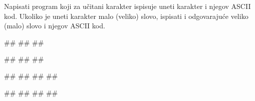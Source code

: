 \begin{Exercise}[label=v1.2_08] 
Napisati program koji za učitani karakter ispisuje uneti karakter i njegov ASCII kod. Ukoliko je uneti karakter malo (veliko) slovo, ispisati i odgovarajuće veliko (malo) slovo i njegov ASCII kod.

\begin{miditest}
\begin{upotreba}{1}
#\naslovInt#
##
##
\end{upotreba}
\end{miditest}
\begin{miditest}
\begin{upotreba}{2}
#\naslovInt#
##
##
\end{upotreba}
\end{miditest}

\begin{maxitest}
\begin{upotreba}{3}
#\naslovInt#
##
##
##
\end{upotreba}
\end{maxitest}

\begin{maxitest}
\begin{upotreba}{4}
#\naslovInt#
##
##
##
\end{upotreba}
\end{maxitest}

\end{Exercise}
\ifresenja
 \begin{Answer}[ref=v1.2_08]
\end{Answer}
\fi



